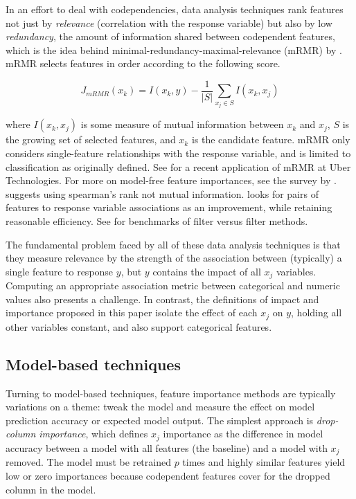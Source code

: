 \documentclass[11pt]{article}
\begin{document}
In an effort to deal with codependencies, data analysis techniques rank features not just by {\em relevance} (correlation with the response variable) but also by low {\em redundancy}, the amount of information shared between codependent features, which is the idea behind minimal-redundancy-maximal-relevance (mRMR) by \citep{mRMR}. mRMR selects features in order according to the following score.

\[
J_{mRMR}(x_k) = I(x_k, y) - \frac{1}{|S|} \sum_{x_j \in S} I(x_k, x_j)
\]

\noindent where $I(x_k, x_j)$ is some measure of mutual information between $x_k$ and $x_j$, $S$ is the growing set of selected features, and $x_k$ is the candidate feature. mRMR only considers single-feature relationships with the response variable, and is limited to classification as originally defined. See \citep{ubermRMR} for a recent application of mRMR at Uber Technologies.  For more on model-free feature importances, see the survey by \citep{survey}.  \citet{tsanas} suggests using spearman's rank not mutual information. \citet{meyer-microarray} looks for pairs of features to response variable associations as an improvement, while retaining reasonable efficiency. See \citet{filter-benchmark} for benchmarks of filter versus filter methods.

The fundamental problem faced by all of these data analysis techniques is that they measure relevance by the strength of the association between (typically) a single feature to response $y$, but $y$ contains the impact of all $x_j$ variables. Computing an appropriate association metric between categorical and numeric values also presents a challenge.  In contrast, the definitions of impact and importance proposed in this paper isolate the effect of each $x_j$ on $y$, holding all other variables constant, and also support categorical features.

\subsection{Model-based techniques}

Turning to model-based techniques, feature importance methods are typically variations on a theme: tweak the model and measure the effect on model prediction accuracy or expected model output. The simplest approach is {\em drop-column importance}, which defines $x_j$ importance as the difference in model accuracy between a model with all features (the baseline) and a model with $x_j$ removed. The model must be retrained $p$ times and highly similar features yield low or zero importances because codependent features cover for the dropped column in the model.
\end{document}

